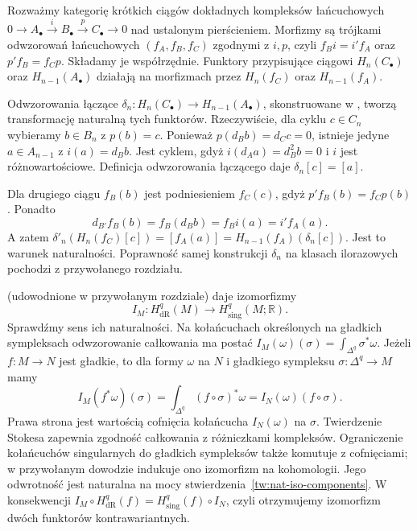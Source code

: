 \begin{przyklad}\label{cat:ex:connecting-natural}
Rozważmy kategorię krótkich ciągów dokładnych kompleksów łańcuchowych $0\to A_\bullet\xrightarrow{i}B_\bullet\xrightarrow{p}C_\bullet\to0$ nad ustalonym pierścieniem. Morfizmy są trójkami odwzorowań łańcuchowych $(f_A,f_B,f_C)$ zgodnymi z $i,p$, czyli $f_Bi=i'f_A$ oraz $p'f_B=f_Cp$. Składamy je współrzędnie. Funktory przypisujące ciągowi $H_n(C_\bullet)$ oraz $H_{n-1}(A_\bullet)$ działają na morfizmach przez $H_n(f_C)$ oraz $H_{n-1}(f_A)$.

Odwzorowania łączące $\delta_n:H_n(C_\bullet)\to H_{n-1}(A_\bullet)$, skonstruowane w , tworzą transformację naturalną tych funktorów. Rzeczywiście, dla cyklu $c\in C_n$ wybieramy $b\in B_n$ z $p(b)=c$. Ponieważ $p(d_Bb)=d_Cc=0$, istnieje jedyne $a\in A_{n-1}$ z $i(a)=d_Bb$. Jest cyklem, gdyż $i(d_Aa)=d_B^2b=0$ i $i$ jest różnowartościowe. Definicja odwzorowania łączącego daje $\delta_n[c]=[a]$.

Dla drugiego ciągu $f_B(b)$ jest podniesieniem $f_C(c)$, gdyż $p'f_B(b)=f_Cp(b)$. Ponadto
\[
d_{B'}f_B(b)=f_B(d_Bb)=f_Bi(a)=i'f_A(a).
\]
A zatem $\delta'_n(H_n(f_C)[c])=[f_A(a)]=H_{n-1}(f_A)(\delta_n[c])$. Jest to warunek naturalności. Poprawność samej konstrukcji $\delta_n$ na klasach ilorazowych pochodzi z przywołanego rozdziału.
\end{przyklad}

\begin{przyklad}\label{cat:ex:derham-natural}
 (udowodnione w przywołanym rozdziale) daje izomorfizmy
\[
I_M:H^q_{\mathrm{dR}}(M)\longrightarrow H^q_{\mathrm{sing}}(M;\mathbb R).
\]
Sprawdźmy sens ich naturalności. Na kołańcuchach określonych na gładkich sympleksach odwzorowanie całkowania ma postać $I_M(\omega)(\sigma)=\int_{\Delta^q}\sigma^*\omega$. Jeżeli $f:M\to N$ jest gładkie, to dla formy $\omega$ na $N$ i gładkiego sympleksu $\sigma:\Delta^q\to M$ mamy
\[
I_M(f^*\omega)(\sigma)=\int_{\Delta^q}(f\circ\sigma)^*\omega
=I_N(\omega)(f\circ\sigma).
\]
Prawa strona jest wartością cofnięcia kołańcucha $I_N(\omega)$ na $\sigma$. Twierdzenie Stokesa zapewnia zgodność całkowania z różniczkami kompleksów. Ograniczenie kołańcuchów singularnych do gładkich sympleksów także komutuje z cofnięciami; w przywołanym dowodzie indukuje ono izomorfizm na kohomologii. Jego odwrotność jest naturalna na mocy stwierdzenia~\ref{tw:nat-iso-components}. W konsekwencji $I_M\circ H^q_{\mathrm{dR}}(f)=H^q_{\mathrm{sing}}(f)\circ I_N$, czyli otrzymujemy izomorfizm dwóch funktorów kontrawariantnych.
\end{przyklad}

